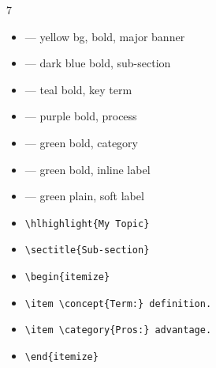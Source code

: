 \documentclass[a4paper,landscape]{article}
\begin{document}
\begin{multicols}{7}
\begin{itemize}
\item {} — yellow bg, bold, major banner
\item {} — dark blue bold, sub-section
\item {} — teal bold, key term
\item {} — purple bold, process
\item {} — green bold, category
\item {} — green bold, inline label
\item {} — green plain, soft label
\end{itemize}

\begin{itemize}
\item \texttt{\textbackslash hlhighlight\{My Topic\}}
\item \texttt{\textbackslash sectitle\{Sub-section\}}
\item \texttt{\textbackslash begin\{itemize\}}
\item \texttt{\textbackslash item \textbackslash concept\{Term:\} definition.}
\item \texttt{\textbackslash item \textbackslash category\{Pros:\} advantage.}
\item \texttt{\textbackslash end\{itemize\}}
\end{itemize}

\end{multicols}
\end{document}
